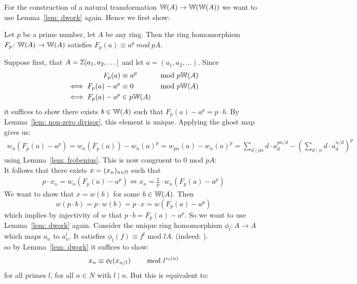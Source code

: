 For the construction of a natural transformation $\mathbb{W}(A) \to \mathbb{W}(\mathbb{W}(A))$
we want to use Lemma~\ref{lem: dwork} again. Hence we first show:
\begin{lemma} \label{lem: frobenius lifts frobenius}
    Let $p$ be a prime number, let $A$ be any ring.
    Then the ring homomorphism $F_p \colon \mathbb{W}(A) \to \mathbb{W}(A)$  
    satisfies $F_p(a) \equiv a^p \ mod \ pA.$
\end{lemma}
\begin{beweis}
    Suppose first, that $A = \mathbb{Z}[a_1,a_2,\dots]$ and let $a = (a_1,a_2,\dots)$. Since
    \begin{align*}
        F_p(a) &\equiv a^p \hskip8mm &\text{mod } p\mathbb{W}(A) \\
        \iff F_p(a)-a^p &\equiv 0 \hskip8mm &\text{mod } p\mathbb{W}(A) \\
        \iff F_p(a) - a^p &\in p\mathbb{W}(A) \\
    \end{align*}
    it suffices to show there exists $b \in \mathbb{W}(A)$ such that $F_p(a)-a^p = p\cdot b$.
    By Lemma~\ref{lem: non-zero divisor}, this element is unique. Applying the ghost map gives us:
    \begin{align*}
        w_n(F_p(a) - a^p) = w_n(F_p(a))-w_n(a)^p = w_{pn}(a) - w_n(a)^p 
        = \sum_{d \mid pn}d \cdot a_d^{pn/d} - ( \sum_{d \mid n} d \cdot a_d^{n/d})^p
    \end{align*}
    using Lemma~\ref{lem: frobenius}. This is now congruent to $0$ mod $pA$:
    \\
    It follows that there exists $x = (x_n)_{n \in \mathbb{N}}$ such that 
    \begin{align}
        \label{eq: p cdot x_n}
        p \cdot x_n = w_n(F_p(a)-a^p)
        \iff x_n = \frac{1}{p} \cdot w_n(F_p(a)-a^p)
    \end{align}
    We want to show that $x = w(b)$ for some $b \in \mathbb{W}(A)$.
    Then 
    \[
        w(p \cdot b) = p \cdot w(b) = p \cdot x = w(F_p(a)-a^p)
    \]
    which implies by injectivity of $w$ that $p \cdot b = F_p(a) -a^p$.
    So we want to use Lemma~\ref{lem: dwork} again.
    Consider the unique ring homomorphism $\phi_l \colon A \to A$ which maps
    $a_n$ to $a_n^l$. It satisfies $\phi_l(f) \equiv f^l$ mod $lA$.
    (indeed: 
    ). \\
    so by Lemma~\ref{lem: dwork} it suffices to show: 
    \[
        x_n \equiv \phi_l(x_{n/l}) \text{\hskip8mm mod }l^{v_l(n)}
    \]
    for all primes $l$, for all $n \in N$ with $l \mid n$.
    But this is equivalent to:

\end{beweis}
